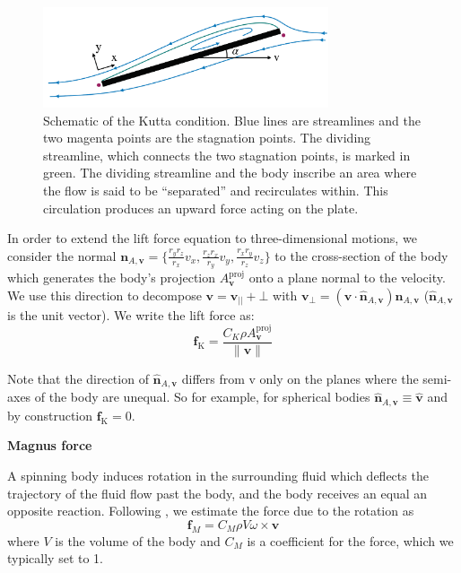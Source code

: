 \documentclass[sn-mathphys-num]{sn-jnl}%
\theoremstyle{thmstyleone}%
\theoremstyle{thmstyletwo}%
\theoremstyle{thmstylethree}%
\begin{document}
\begin{appendices}
\begin{figure}[!htb] 
	\centering
	\includegraphics[width=0.75\textwidth]{fig/supplementary_fig_1.png}
	\caption{
		Schematic of the Kutta condition. 
		Blue lines are streamlines and the two magenta points are the stagnation points. 
		The dividing streamline, which connects the two stagnation points, is marked in green. 
		The dividing streamline and the body inscribe an area where the flow is said to be “separated” and recirculates within. 
		This circulation produces an upward force acting on the plate.
	}
	\label{fig:supplementary_fig_1}
\end{figure}

In order to extend the lift force equation to three-dimensional motions, we consider the normal $ \mathbf{n}_{A, \mathbf{v}} = \{ \frac{r_y r_z}{r_x} v_x, \frac{r_z r_x}{r_y} v_y, \frac{r_x r_y}{r_z} v_z \} $ to the cross-section of the body which generates the body's projection $ A_\mathbf{v}^\text{proj} $ onto a plane normal to the velocity. 
We use this direction to decompose  $ \mathbf{v} = \mathbf{v}_{||} + \mathbf{\bot} $ with $ \mathbf{v}_\bot = (\mathbf{v} \cdot \hat{\mathbf{n}}_{A,\mathbf{v}}) \hat{\mathbf{n}}_{A, \mathbf{v}} $ ($ \hat{\mathbf{n}}_{A, \mathbf{v}} $ is the unit vector). 
We write the lift force as:
%
\begin{equation}\label{key}
	\mathbf{f}_\text{K} = 
		\frac{
			C_K \rho A_\mathbf{v}^\text{proj}
		}{
			\| \mathbf{v} \|
		}
\end{equation}


Note that the direction of $ \hat{\mathbf{n}}_{A, \mathbf{v}} $ differs from v only on the planes where the semi-axes of the body are unequal. 
So for example, for spherical bodies $ \hat{\mathbf{n}}_{A, \mathbf{v}} \equiv \hat{\mathbf{v}}  $ and by construction $ \mathbf{f}_\text{K} = 0 $.



\textbf{Magnus force}

A spinning body induces rotation in the surrounding fluid which deflects the trajectory of the fluid flow past the body, and the body receives an equal an opposite reaction. 
Following \cite{andersen2005analysis}, we estimate the force due to the rotation as
\begin{equation}\label{eq:magus_force}
	\mathbf{f}_M = 
		C_M \rho V \omega \times \mathbf{v}
\end{equation}
%
where $ V $ is the volume of the body and $ C_M $ is a coefficient for the force, which we typically set to 1.



\end{appendices}
\end{document}
